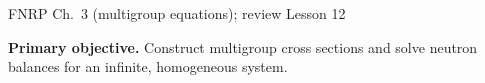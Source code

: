 \providecommand{\dd}{\,\mathrm{d}}
\AtBeginDocument{\setlength{\abovedisplayskip}{4pt plus 1pt minus 1pt}
\setlength{\belowdisplayskip}{4pt plus 1pt minus 1pt}
\setlength{\abovedisplayshortskip}{3pt plus 1pt}
\setlength{\belowdisplayshortskip}{3pt plus 1pt}
\setlength{\jot}{2pt}
}

  {FNRP Ch.~3 (multigroup equations); review Lesson 12}

\MakeHandoutTitle
\textcolor{KSUDeepPurple}{\textbf{Primary objective.}}
Construct multigroup cross sections and solve neutron balances
for an infinite, homogeneous system.
\par\vspace{5pt}

